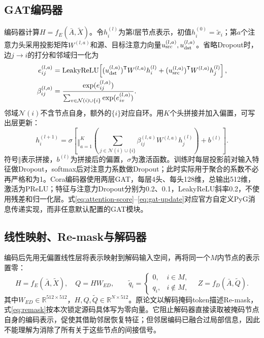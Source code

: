 \subsection{GAT编码器}
编码器计算$H=f_E(\bar A,\widetilde X)$。令$h_i^{(l)}$为第$l$层节点表示，初值$h_i^{(0)}=\widetilde x_i$；第$a$个注意力头采用投影矩阵$W^{(l,a)}$和源、目标注意力向量$u_{\rm src}^{(l,a)},u_{\rm dst}^{(l,a)}$。省略Dropout时，边$j\to i$的打分和邻域归一化为
\begin{align}
e_{ij}^{(l,a)}&=\operatorname{LeakyReLU}\!\left[
(u_{\rm dst}^{(l,a)})^{\mathsf T}W^{(l,a)}h_i^{(l)}+
(u_{\rm src}^{(l,a)})^{\mathsf T}W^{(l,a)}h_j^{(l)}\right],\label{eq:attention-score}\\
\beta_{ij}^{(l,a)}&=\frac{\exp(e_{ij}^{(l,a)})}
{\sum_{v\in\mathcal N(i)\cup\{i\}}\exp(e_{iv}^{(l,a)})}.\label{eq:attention-weight}
\end{align}
邻域$\mathcal N(i)$不含节点自身，额外的$\{i\}$对应自环。用$K$个头拼接并加入偏置，可写出层更新：
\begin{equation}\label{eq:gat-update}
h_i^{(l+1)}=\sigma\!\left[
\mathop{\Vert}_{a=1}^{K}\left(\sum_{j\in\mathcal N(i)\cup\{i\}}
\beta_{ij}^{(l,a)}W^{(l,a)}h_j^{(l)}\right)+b^{(l)}\right].
\end{equation}
符号$\Vert$表示拼接，$b^{(l)}$为拼接后的偏置，$\sigma$为激活函数。训练时每层投影前对输入特征做Dropout，softmax后对注意力系数做Dropout；此时实际用于聚合的系数不必再严格和为1。Cora编码器使用两层GAT，每层4头、每头128维，总输出512维，激活为PReLU；特征与注意力Dropout分别为0.2、0.1，LeakyReLU斜率0.2，不使用残差和归一化层。式\eqref{eq:attention-score}--\eqref{eq:gat-update}对应官方自定义PyG消息传递实现，而非任意默认配置的GAT模块。

\subsection{线性映射、Re-mask与解码器}
编码后先用无偏置线性层将表示映射到解码输入空间，再将同一个$M$内节点的表示置零：
\begin{equation}\label{eq:remask}
H=f_E(\bar A,\widetilde X),\quad Q=HW_{ED},\qquad
\widetilde q_i=\begin{cases}0,&i\in M,\\q_i,&i\notin M,\end{cases}
\quad Z=f_D(\bar A,\widetilde Q).
\end{equation}
其中$W_{ED}\in\mathbb R^{512\times512}$，$H,Q,\widetilde Q\in\mathbb R^{N\times512}$。原论文以解码掩码token描述Re-mask，式\eqref{eq:remask}按本次锁定源码具体写为零向量。它阻止解码器直接读取被掩码节点自身的编码表示，促使其借助邻居恢复特征；但邻居编码已融合过局部信息，因此不能理解为消除了所有关于这些节点的间接信号。

